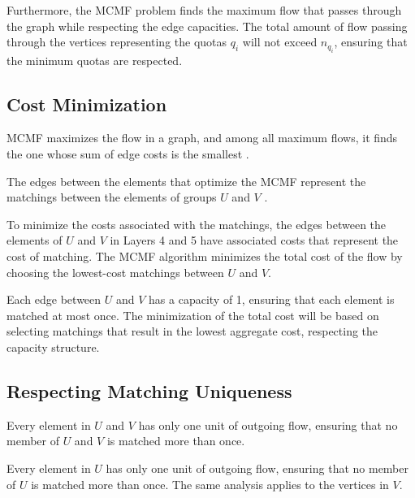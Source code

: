         Furthermore, the MCMF problem finds the maximum flow that passes through the graph while respecting the edge capacities. The total amount of flow passing through the vertices representing the quotas $q_i$ will not exceed $n_{q_i}$, ensuring that the minimum quotas are respected.
        
        \subsection{Cost Minimization}
        
        \begin{lemma}
           MCMF maximizes the flow in a graph, and among all maximum flows, it finds the one whose sum of edge costs is the smallest \cite{edmonds1972theoretical}.
        \end{lemma}
        
        \begin{lemma}
           The edges between the elements that optimize the MCMF represent the matchings between the elements of groups $U$ and $V$ \cite{edmonds1972theoretical}.
        \end{lemma}
        
        To minimize the costs associated with the matchings, the edges between the elements of $U$ and $V$ in Layers 4 and 5 have associated costs that represent the cost of matching. The MCMF algorithm minimizes the total cost of the flow by choosing the lowest-cost matchings between $U$ and $V$.
        
        Each edge between $U$ and $V$ has a capacity of 1, ensuring that each element is matched at most once. The minimization of the total cost will be based on selecting matchings that result in the lowest aggregate cost, respecting the capacity structure.
        
        \subsection{Respecting Matching Uniqueness}
        
        \begin{lemma}
           Every element in $U$ and $V$ has only one unit of outgoing flow, ensuring that no member of $U$ and $V$ is matched more than once.
        \end{lemma}
        
        Every element in $U$ has only one unit of outgoing flow, ensuring that no member of $U$ is matched more than once. The same analysis applies to the vertices in $V$.
        
